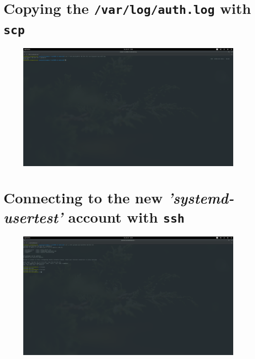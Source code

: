 \documentclass[12pt]{report}
\begin{document}
\section{Copying the \texttt{/var/log/auth.log} with \texttt{scp}}
\label{app:screenshots:3}
\begin{figure}[H]
  \centering
  \includegraphics[width=0.7\paperheight, angle=-90]{It's_Elementary_my_dear_Watson!-2017-12-19-15-59-43}
\end{figure}
\section{Connecting to the new \textit{'systemd-usertest'} account with \texttt{ssh}}
\label{app:screenshots:4}
\begin{figure}[H]
  \centering
  \includegraphics[width=0.7\paperheight, angle=-90]{It's_Elementary_my_dear_Watson!-2017-12-19-20-19-08}
\end{figure}
\end{document}
